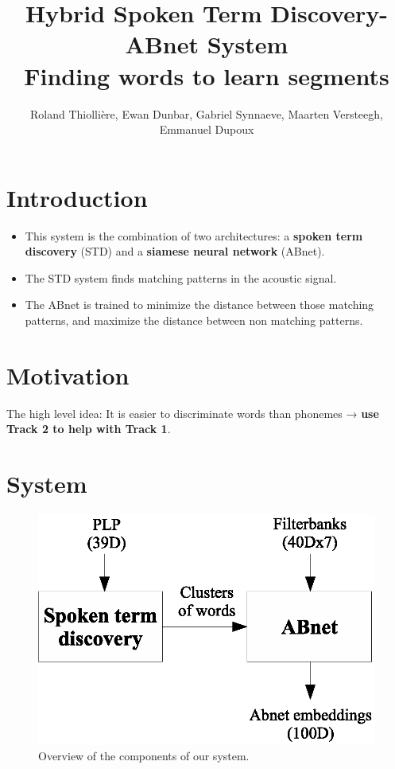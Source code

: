 \documentclass[final]{beamer}
\title
[Interspeech (2015, Dresden, Germany)] %
{ %
Hybrid Spoken Term Discovery-ABnet System\\
Finding words to learn segments
}
\author{ %
Roland Thiolli\`ere\inst{*}, Ewan Dunbar\inst{*}, Gabriel Synnaeve\inst{*\dagger}, Maarten Versteegh\inst{*}, Emmanuel Dupoux\inst{*}
}
\institute
[ENS] %
{
\inst{*} LSCP, \'{E}cole Normale Sup\'{e}rieure / EHESS / CNRS, Paris, France\\%
\inst{\dagger} now at Facebook AI Research\\[0.5ex]
\inst{} \begin{small}\texttt{rolthiolliere@gmail.com, emd@umd.edu, gabrielsynnaeve@gmail.com, maartenversteegh@gmail.com, emmanuel.dupoux@gmail.com}\end{small}
}
\newcommand{\abnet}{{\sc ABnet}}
\begin{document}
\begin{frame}[t]
\begin{multicols}{2} %

\section{Introduction}

\begin{itemize}
\item This system is the combination of two architectures: a \textbf{spoken term discovery}\cite{jansenvandurme2011} (STD) and a \textbf{siamese neural network}\cite{synnaevedupoux2014} (\abnet{}).
\item The STD system finds matching patterns in the acoustic signal.
\item The \abnet{} is trained to minimize the distance between those matching patterns, and maximize the distance between non matching patterns.
\end{itemize}



\section{Motivation}

The high level idea: It is easier to discriminate words than phonemes → \textbf{use Track 2 to help with Track 1}.


\section{System}

\begin{figure}[ht!]
  \begin{center}
    \includegraphics[width=0.7\columnwidth]{system_overview2}
    \caption{\label{fig:system}Overview of the components of our system.}
  \end{center}
\end{figure}


\end{multicols}
\end{frame}
\end{document}
